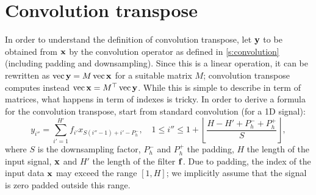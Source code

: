 \section{Convolution transpose}\label{s:impl-convolution-transpose}

In order to understand the definition of convolution transpose, let $\mathbf{y}$ to be obtained from $\mathbf{x}$ by the convolution operator as defined in \cref{s:convolution} (including padding and downsampling).  Since this is a linear operation, it can be rewritten as $\operatorname{vec} \mathbf{y} = M \operatorname{vec}\mathbf{x}$ for a suitable matrix $M$; convolution transpose computes instead $\operatorname{vec} \mathbf{x} = M^\top \operatorname{vec} \mathbf{y}$.  While this is simple to describe in term of matrices, what happens in term of indexes is tricky. In order to derive a formula for the convolution transpose, start from standard convolution (for a 1D signal):
\[
   y_{i''} = \sum_{i'=1}^{H'} f_{i'} x_{S (i''-1) + i' - P_h^-}, 
   \quad
    1 \leq i'' \leq 1 + \left\lfloor \frac{H - H' + P_h^- + P_h^+}{S} \right\rfloor,
\]
where $S$ is the downsampling factor, $P_h^-$ and $P_h^+$ the padding, $H$ the length of the input signal, $\mathbf{x}$ and $H'$ the length of the filter $\mathbf{f}$. Due to padding, the index of the input data $\mathbf{x}$ may exceed the range $[1,H]$; we implicitly assume that the signal is zero padded outside this range.

